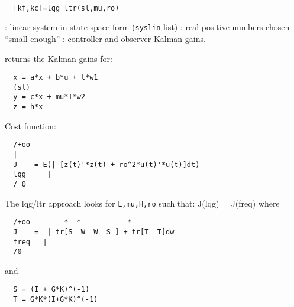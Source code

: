 \begin{mandesc}
   \\ %
\end{mandesc}
\begin{calling_sequence}
\begin{verbatim}
  [kf,kc]=lqg_ltr(sl,mu,ro)  
\end{verbatim}
\end{calling_sequence}
\begin{parameters}
  \begin{varlist}
    : linear system in state-space form (\verb!syslin! list)
    :  real positive numbers chosen ``small enough''
    : controller and observer Kalman gains.
  \end{varlist}
\end{parameters}
\begin{mandescription}
  returns the Kalman gains for:
\begin{verbatim}
  x = a*x + b*u + l*w1   
  (sl)
  y = c*x + mu*I*w2
  z = h*x
\end{verbatim}
Cost function:
\begin{verbatim}
  /+oo
  |
  J    = E(| [z(t)'*z(t) + ro^2*u(t)'*u(t)]dt)
  lqg     |
  / 0
\end{verbatim}
The lqg/ltr approach looks for \verb!L,mu,H,ro! such that:
J(lqg) = J(freq) where
\begin{verbatim}
  /+oo        *  *           *
  J    =  | tr[S  W  W  S ] + tr[T  T]dw
  freq   |
  /0
\end{verbatim}
and
\begin{verbatim}
  S = (I + G*K)^(-1)  
  T = G*K*(I+G*K)^(-1)
\end{verbatim}
\end{mandescription}
\begin{manseealso}
\end{manseealso}
